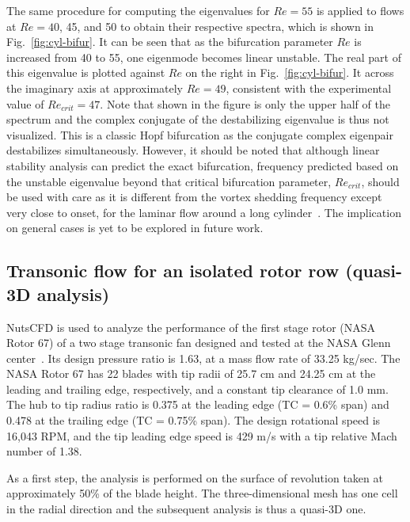 \documentclass[journal,final]{new-aiaa}
\begin{document}
The same procedure for computing the eigenvalues for $Re=55$ is applied to flows at $Re=40$, 45, and 50
to obtain their respective spectra, which is shown in Fig.~\ref{fig:cyl-bifur}. It can be seen that as the
bifurcation parameter $Re$ is increased from 40 to 55, one eigenmode becomes linear unstable. The
real part of this eigenvalue is plotted against $Re$ on the right in Fig.~\ref{fig:cyl-bifur}. It across the
imaginary axis at approximately $Re=49$, consistent with the experimental value of $Re_{crit}=47$.
Note that shown in the figure is only the upper half of the spectrum and the complex conjugate of
the destabilizing eigenvalue is thus not visualized. This is a classic Hopf bifurcation as the conjugate
complex eigenpair destabilizes simultaneously. However, it should be noted
that although linear stability analysis can predict the exact bifurcation, frequency predicted
based on the unstable eigenvalue beyond that
critical bifurcation parameter, $Re_{crit}$, should be used with care as it is different
from the vortex shedding frequency except very close to onset, for the laminar flow
around a long cylinder~\cite{barkley2006linear}. The implication on general cases
is yet to be explored in future work.

\subsection{Transonic flow for an isolated rotor row (quasi-3D analysis)}
NutsCFD is used to analyze the performance of the first
stage rotor (NASA Rotor 67) of a two stage transonic fan
designed and tested at the NASA Glenn center~\cite{strazisar1989laser}.
Its design pressure ratio is
1.63, at a mass flow rate of 33.25 kg/sec. 
The NASA Rotor 67 has 22 blades with tip radii of 25.7 cm
and 24.25 cm at the leading and trailing edge, respectively,
and a constant tip clearance of 1.0 mm. The hub to tip radius
ratio is 0.375 at the leading edge (TC = 0.6\% span) and 0.478
at the trailing edge (TC = 0.75\% span). The design rotational
speed is 16,043 RPM, and the tip leading edge speed is 429 m/s
with a tip relative Mach number of 1.38.

As a first step, the analysis is performed on the surface of
revolution taken at approximately 50\% of the blade height.
The three-dimensional mesh has one cell in the radial direction
and the subsequent analysis is thus a quasi-3D one.
\end{document}
